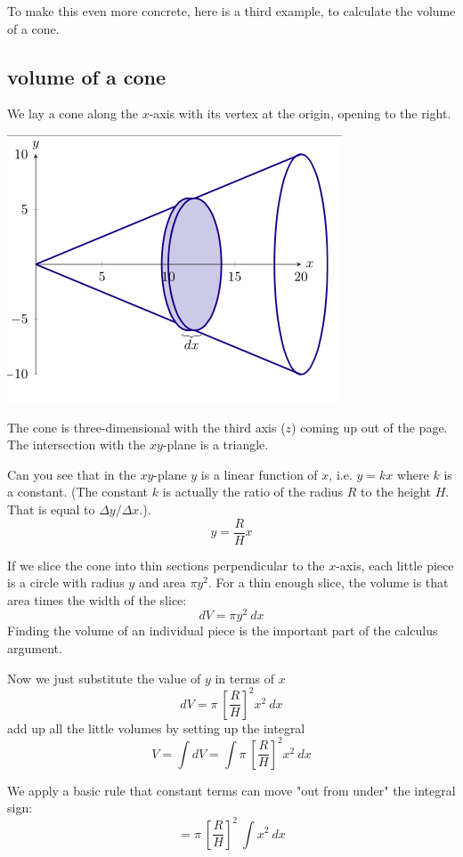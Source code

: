 \documentclass[11pt, oneside]{article}
\begin{document}
To make this even more concrete, here is a third example, to calculate the volume of a cone.  

\subsection*{volume of a cone}

We lay a cone along the $x$-axis with its vertex at the origin, opening to the right.
\begin{center}\includegraphics [scale=0.4] {cone_sideways.png}\end{center}
The cone is three-dimensional with the third axis ($z$) coming up out of the page.  The intersection with the $xy$-plane is a triangle.  

Can you see that in the $xy$-plane $y$ is a linear function of $x$, i.e. $y = kx$ where $k$ is a constant.  (The constant $k$ is actually the ratio of the radius $R$ to the height $H$.  That is equal to $\Delta y/\Delta x$.).
\[ y = \frac{R}{H} x \]

If we slice the cone into thin sections perpendicular to the $x$-axis, each little piece is a circle with radius $y$ and area $\pi y^2$.  For a thin enough slice, the volume is that area times the width of the slice:
\[ dV = \pi y^2 \ dx \]
Finding the volume of an individual piece is the important part of the calculus argument.

Now we just substitute the value of $y$ in terms of $x$
\[ dV = \pi \ [ \frac{R}{H} ]^2  x^2 \ dx \]
add up all the little volumes by setting up the integral
\[ V = \int dV = \int \pi \ [ \frac{R}{H} ]^2 x^2 \ dx \]

We apply a basic rule that constant terms can move "out from under" the integral sign:
\[ = \pi \ [ \frac{R}{H} ]^2 \ \int x^2 \ dx \]
\end{document}
